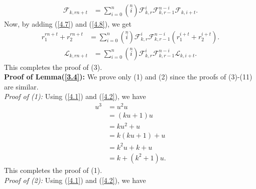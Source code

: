 \begin{align*}
\mathcal{F}_{k,rn+t}&=\sum\limits_{i=0}^{n}\left( \stackrel{n}{i}\right)\mathcal{F}_{k,r}^i\mathcal{F}_{k,r-1}^{n-i}\mathcal{F}_{k,i+t}.
\end{align*}
Now, by adding (\ref{4.7}) and (\ref{4.8}), we get 
\begin{align*}
r_1^{rn+t}+r_2^{rn+t}&=\sum\limits_{i=0}^{n}\left( \stackrel{n}{i}\right)\mathcal{F}_{k,r}^i\mathcal{F}_{k,r-1}^{n-i}(r_1^{i+t}+r_2^{i+t}).
\end{align*}
\begin{align*}
\mathcal{L}_{k,rn+t}&=\sum\limits_{i=0}^{n}\left( \stackrel{n}{i}\right)\mathcal{F}_{k,r}^i\mathcal{F}_{k,r-1}^{n-i}\mathcal{L}_{k,i+t}.
\end{align*}
This completes the proof of (3).\\
\textbf{Proof of Lemma(\ref{3.4}):} We prove only (1) and (2) since the proofs of (3)-(11) are similar.\\
\textit{Proof of (1):}
Using (\ref{4.1}) and (\ref{4.2}), we have
\begin{align*}
u^3&=u^2u\\
&=(ku+1)u\\
&=ku^2+u\\
&=k(ku+1)+u\\
&=k^2u+k+u\\
&=k+(k^2+1)u.
\end{align*}
This completes the proof of (1).\\
\textit{Proof of (2):}
Using (\ref{4.1}) and (\ref{4.2}), we have

